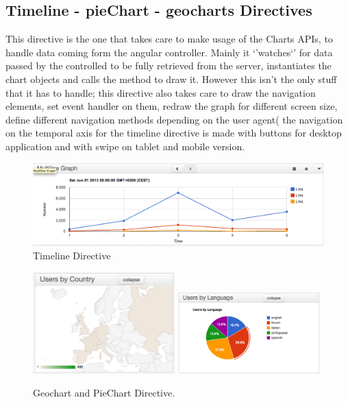 \documentclass[a4paper,13pt]{report}
\begin{document}
\subsection{Timeline - pieChart - geocharts Directives} %
This directive is the one that takes care to make usage of the Charts APIs, to handle data coming form the angular controller.
Mainly it `'watches`' for data passed by the controlled to be fully retrieved from the server, instantiates the chart objects and calls the method to draw it.
However this isn't the only stuff that it has to handle; this directive also takes care to draw the navigation elements, set event handler on them, redraw the graph for different screen size, define different navigation methods depending on the user agent( the navigation on the temporal axis for the timeline directive is made with buttons for desktop application and with swipe on tablet and mobile version.
\begin{figure}[H]
  \caption{Timeline Directive}
  \centering
    \includegraphics[width=1\textwidth]{pics/proto/timeline}
\end{figure}
\begin{figure}[H]
  \caption{Geochart and PieChart Directive.}
  \centering
    \includegraphics[width=0.489\textwidth]{pics/proto/geoChart}
    \includegraphics[width=0.489\textwidth]{pics/proto/pieChart}
\end{figure}
\end{document}
